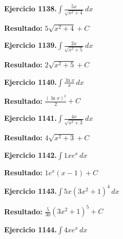 \documentclass[10pt,a4paper]{article}
\begin{document}
\newpage
\begin{ejbox}
\textbf{Ejercicio 1138.}\quad $\int \frac{5x}{\sqrt{x^2+4}}\,dx$
\end{ejbox}

\begin{solbox}
\textbf{Resultado:} \(\displaystyle 5\sqrt{x^2+4} + C\)
\end{solbox}

\begin{ejbox}
\textbf{Ejercicio 1139.}\quad $\int \frac{2x}{\sqrt{x^2+5}}\,dx$
\end{ejbox}

\begin{solbox}
\textbf{Resultado:} \(\displaystyle 2\sqrt{x^2+5} + C\)
\end{solbox}

\begin{ejbox}
\textbf{Ejercicio 1140.}\quad $\int \frac{\ln x}{x}\,dx$
\end{ejbox}

\begin{solbox}
\textbf{Resultado:} \(\displaystyle \frac{(\ln x)^2}{2} + C\)
\end{solbox}

\newpage
\begin{ejbox}
\textbf{Ejercicio 1141.}\quad $\int \frac{4x}{\sqrt{x^2+3}}\,dx$
\end{ejbox}

\begin{solbox}
\textbf{Resultado:} \(\displaystyle 4\sqrt{x^2+3} + C\)
\end{solbox}

\begin{ejbox}
\textbf{Ejercicio 1142.}\quad $\int 1x e^{x}\,dx$
\end{ejbox}

\begin{solbox}
\textbf{Resultado:} \(\displaystyle 1e^x(x-1) + C\)
\end{solbox}

\begin{ejbox}
\textbf{Ejercicio 1143.}\quad $\int 5x(3x^2 + 1)^{4}\,dx$
\end{ejbox}

\begin{solbox}
\textbf{Resultado:} \(\displaystyle \frac{5}{30}(3x^2+1)^{5} + C\)
\end{solbox}

\newpage
\begin{ejbox}
\textbf{Ejercicio 1144.}\quad $\int 4x e^{x}\,dx$
\end{ejbox}
\end{document}
